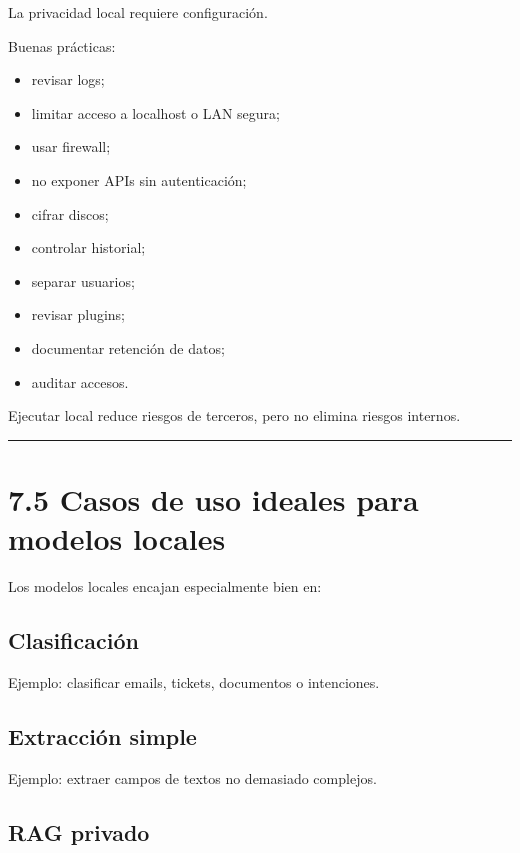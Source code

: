 La privacidad local requiere configuración.

Buenas prácticas:

\begin{itemize}
\tightlist
\item
  revisar logs;
\item
  limitar acceso a localhost o LAN segura;
\item
  usar firewall;
\item
  no exponer APIs sin autenticación;
\item
  cifrar discos;
\item
  controlar historial;
\item
  separar usuarios;
\item
  revisar plugins;
\item
  documentar retención de datos;
\item
  auditar accesos.
\end{itemize}

Ejecutar local reduce riesgos de terceros, pero no elimina riesgos
internos.

\begin{center}\rule{0.5\linewidth}{0.5pt}\end{center}

\section{7.5 Casos de uso ideales para modelos
locales}\label{casos-de-uso-ideales-para-modelos-locales}

Los modelos locales encajan especialmente bien en:

\subsection{Clasificación}\label{clasificaciuxf3n}

Ejemplo: clasificar emails, tickets, documentos o intenciones.

\subsection{Extracción simple}\label{extracciuxf3n-simple}

Ejemplo: extraer campos de textos no demasiado complejos.

\subsection{RAG privado}\label{rag-privado}

